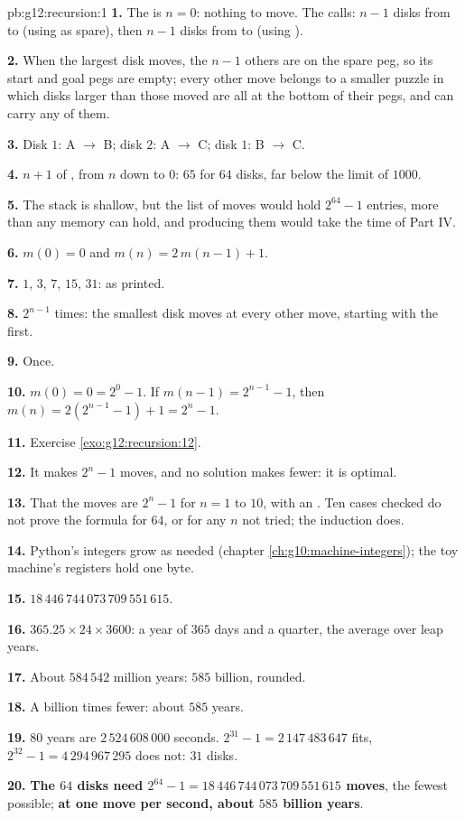 \begin{solution}{pb:g12:recursion:1}
\textbf{1.} The  is $n = 0$: nothing to move. The calls: $n - 1$ disks from  to 
(using  as spare), then $n - 1$ disks from  to  (using ).

\textbf{2.} When the largest disk moves, the $n - 1$ others are on the spare peg, so its start and goal pegs are
empty; every other move belongs to a smaller puzzle in which disks larger than those moved are all at the bottom of
their pegs, and can carry any of them.

\textbf{3.} Disk $1$: A $\to$ B; disk $2$: A $\to$ C; disk $1$: B $\to$ C.

\textbf{4.} $n + 1$  of , from $n$ down to $0$: $65$ for $64$ disks, far below the limit of $1000$.

\textbf{5.} The stack is shallow, but the list of moves would hold $2^{64} - 1$ entries, more than any memory can
hold, and producing them would take the time of Part IV.

\textbf{6.} $m(0) = 0$ and $m(n) = 2\,m(n - 1) + 1$.

\textbf{7.} $1$, $3$, $7$, $15$, $31$: as printed.

\textbf{8.} $2^{n-1}$ times: the smallest disk moves at every other move, starting with the first.

\textbf{9.} Once.

\textbf{10.} $m(0) = 0 = 2^0 - 1$. If $m(n - 1) = 2^{n-1} - 1$, then $m(n) = 2(2^{n-1} - 1) + 1 = 2^n - 1$.

\textbf{11.} Exercise \ref{exo:g12:recursion:12}.

\textbf{12.} It makes $2^n - 1$ moves, and no solution makes fewer: it is optimal.

\textbf{13.} That the moves are $2^n - 1$ for $n = 1$ to $10$, with an . Ten cases checked do not prove
the formula for $64$, or for any $n$ not tried; the induction does.

\textbf{14.} Python's integers grow as needed (chapter \ref{ch:g10:machine-integers}); the toy machine's registers
hold one byte.

\textbf{15.} $18\,446\,744\,073\,709\,551\,615$.

\textbf{16.} $365.25 \times 24 \times 3600$: a year of $365$ days and a quarter, the average over leap years.

\textbf{17.} About $584\,542$ million years: $585$ billion, rounded.

\textbf{18.} A billion times fewer: about $585$ years.

\textbf{19.} $80$ years are $2\,524\,608\,000$ seconds. $2^{31} - 1 = 2\,147\,483\,647$ fits, $2^{32} - 1 =
4\,294\,967\,295$ does not: $31$ disks.

\textbf{20.} \textbf{The $64$ disks need $2^{64} - 1 = 18\,446\,744\,073\,709\,551\,615$ moves}, the fewest possible;
\textbf{at one move per second, about $585$ billion years}.
\end{solution}
